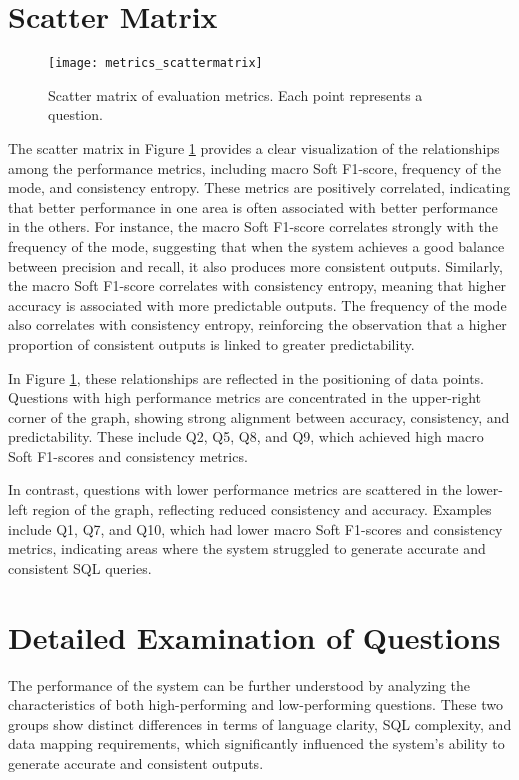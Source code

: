 \section{Scatter Matrix}

\begin{figure}[htbp]
\centering
\texttt{[image: metrics\_scattermatrix]}
\caption{Scatter matrix of evaluation metrics. Each point represents a question.}
\label{fig:metrics_scattermatrix}
\end{figure}

The scatter matrix in Figure \ref{fig:metrics_scattermatrix} provides a clear visualization of the relationships among the performance metrics, including macro Soft F1-score, frequency of the mode, and consistency entropy. These metrics are positively correlated, indicating that better performance in one area is often associated with better performance in the others. For instance, the macro Soft F1-score correlates strongly with the frequency of the mode, suggesting that when the system achieves a good balance between precision and recall, it also produces more consistent outputs. Similarly, the macro Soft F1-score correlates with consistency entropy, meaning that higher accuracy is associated with more predictable outputs. The frequency of the mode also correlates with consistency entropy, reinforcing the observation that a higher proportion of consistent outputs is linked to greater predictability.

In Figure \ref{fig:metrics_scattermatrix}, these relationships are reflected in the positioning of data points. Questions with high performance metrics are concentrated in the upper-right corner of the graph, showing strong alignment between accuracy, consistency, and predictability. These include Q2, Q5, Q8, and Q9, which achieved high macro Soft F1-scores and consistency metrics.

In contrast, questions with lower performance metrics are scattered in the lower-left region of the graph, reflecting reduced consistency and accuracy. Examples include Q1, Q7, and Q10, which had lower macro Soft F1-scores and consistency metrics, indicating areas where the system struggled to generate accurate and consistent SQL queries.

\section{Detailed Examination of Questions}

The performance of the system can be further understood by analyzing the characteristics of both high-performing and low-performing questions. These two groups show distinct differences in terms of language clarity, SQL complexity, and data mapping requirements, which significantly influenced the system's ability to generate accurate and consistent outputs.

